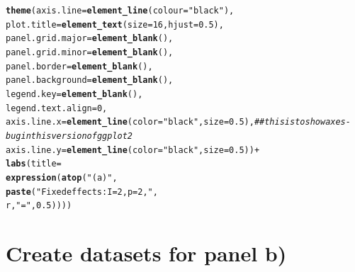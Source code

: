 \documentclass{article}\usepackage[]{graphicx}\usepackage[]{color}
\makeatletter
\newcommand{\hlnum}[1]{\textcolor[rgb]{0.686,0.059,0.569}{#1}}%
\newcommand{\hlstr}[1]{\textcolor[rgb]{0.192,0.494,0.8}{#1}}%
\newcommand{\hlcom}[1]{\textcolor[rgb]{0.678,0.584,0.686}{\textit{#1}}}%
\newcommand{\hlopt}[1]{\textcolor[rgb]{0,0,0}{#1}}%
\newcommand{\hlstd}[1]{\textcolor[rgb]{0.345,0.345,0.345}{#1}}%
\newcommand{\hlkwc}[1]{\textcolor[rgb]{0.333,0.667,0.333}{#1}}%
\newcommand{\hlkwd}[1]{\textcolor[rgb]{0.737,0.353,0.396}{\textbf{#1}}}%
\newenvironment{kframe}{%
 \def\at@end@of@kframe{}%
 \ifinner\ifhmode%
  \def\at@end@of@kframe{\end{minipage}}%
  \begin{minipage}{\columnwidth}%
 \fi\fi%
 \def\FrameCommand##1{\hskip\@totalleftmargin \hskip-\fboxsep
 \colorbox{shadecolor}{##1}\hskip-\fboxsep
     \hskip-\linewidth \hskip-\@totalleftmargin \hskip\columnwidth}%
 \MakeFramed {\advance\hsize-\width
   \@totalleftmargin\z@ \linewidth\hsize
   \@setminipage}}%
 {\par\unskip\endMakeFramed%
 \at@end@of@kframe}
\newenvironment{knitrout}{}{} %
\makeatother
\begin{document}
\begin{knitrout}
\begin{kframe}
\begin{alltt}
  \hlkwd{theme}\hlstd{(}\hlkwc{axis.line} \hlstd{=} \hlkwd{element_line}\hlstd{(}\hlkwc{colour} \hlstd{=} \hlstr{"black"}\hlstd{),}
        \hlkwc{plot.title} \hlstd{=} \hlkwd{element_text}\hlstd{(}\hlkwc{size} \hlstd{=} \hlnum{16}\hlstd{,} \hlkwc{hjust} \hlstd{=} \hlnum{0.5}\hlstd{),}
        \hlkwc{panel.grid.major} \hlstd{=} \hlkwd{element_blank}\hlstd{(),}
        \hlkwc{panel.grid.minor} \hlstd{=} \hlkwd{element_blank}\hlstd{(),}
        \hlkwc{panel.border} \hlstd{=} \hlkwd{element_blank}\hlstd{(),}
        \hlkwc{panel.background} \hlstd{=} \hlkwd{element_blank}\hlstd{(),}
        \hlkwc{legend.key} \hlstd{=} \hlkwd{element_blank}\hlstd{(),}
        \hlkwc{legend.text.align} \hlstd{=} \hlnum{0}\hlstd{,}
        \hlkwc{axis.line.x} \hlstd{=} \hlkwd{element_line}\hlstd{(}\hlkwc{color}\hlstd{=}\hlstr{"black"}\hlstd{,} \hlkwc{size} \hlstd{=} \hlnum{0.5}\hlstd{),} \hlcom{##this is to show axes - bug in this version of ggplot2}
        \hlkwc{axis.line.y} \hlstd{=} \hlkwd{element_line}\hlstd{(}\hlkwc{color}\hlstd{=}\hlstr{"black"}\hlstd{,} \hlkwc{size} \hlstd{=} \hlnum{0.5}\hlstd{))} \hlopt{+}
  \hlkwd{labs}\hlstd{(}\hlkwc{title}\hlstd{=}
         \hlkwd{expression}\hlstd{(}\hlkwd{atop}\hlstd{(}\hlstr{"(a)"}\hlstd{,}
                         \hlkwd{paste}\hlstd{(}\hlstr{"Fixed effects: I = 2, p = 2, "}\hlstd{,}
                               \hlstd{r,} \hlstr{" = "}\hlstd{,} \hlnum{0.5}\hlstd{))))}
\end{alltt}
\end{kframe}
\end{knitrout}

\section{Create datasets for panel b)}
\end{document}
